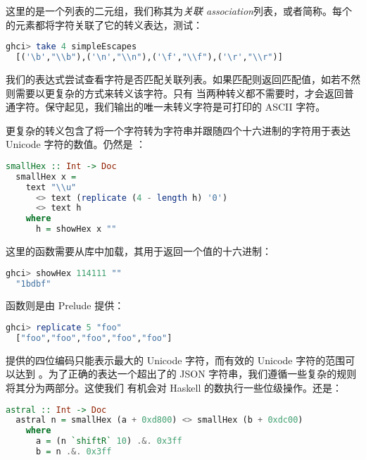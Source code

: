 \documentclass[./main.tex]{subfiles}
\begin{document}
这里的是一个列表的二元组，我们称其为\textit{关联 association}列表，或者简称。每个
的元素都将字符关联了它的转义表达，测试：

\begin{lstlisting}[language=Haskell]
  ghci> take 4 simpleEscapes
  [('\b',"\\b"),('\n',"\\n"),('\f',"\\f"),('\r',"\\r")]
\end{lstlisting}

我们的表达式尝试查看字符是否匹配关联列表。如果匹配则返回匹配值，如若不然则需要以更复杂的方式来转义该字符。只有
当两种转义都不需要时，才会返回普通字符。保守起见，我们输出的唯一未转义字符是可打印的 ASCII 字符。

更复杂的转义包含了将一个字符转为字符串并跟随四个十六进制的字符用于表达 Unicode 字符的数值。仍然是
：

\begin{lstlisting}[language=Haskell]
  smallHex :: Int -> Doc
  smallHex x =
    text "\\u"
      <> text (replicate (4 - length h) '0')
      <> text h
    where
      h = showHex x ""
\end{lstlisting}

这里的函数需要从库中加载，其用于返回一个值的十六进制：

\begin{lstlisting}[language=Haskell]
  ghci> showHex 114111 ""
  "1bdbf"
\end{lstlisting}

函数则是由 Prelude 提供：

\begin{lstlisting}[language=Haskell]
  ghci> replicate 5 "foo"
  ["foo","foo","foo","foo","foo"]
\end{lstlisting}

提供的四位编码只能表示最大的 Unicode 字符，而有效的 Unicode 字符的范围可以达到
。为了正确的表达一个超出了的 JSON 字符串，我们遵循一些复杂的规则将其分为两部分。这使我们
有机会对 Haskell 的数执行一些位级操作。还是：

\begin{lstlisting}[language=Haskell]
  astral :: Int -> Doc
  astral n = smallHex (a + 0xd800) <> smallHex (b + 0xdc00)
    where
      a = (n `shiftR` 10) .&. 0x3ff
      b = n .&. 0x3ff
\end{lstlisting}
\end{document}
